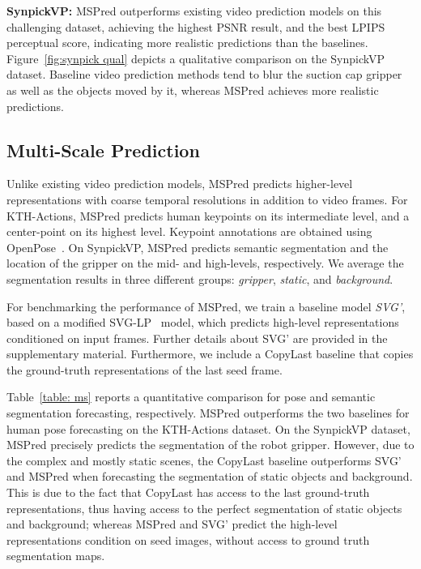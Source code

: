 \documentclass{bmvc2k}
\newcommand{\Figure}[1]{Figure~\ref{#1}}
\newcommand{\Table}[1]{Table~\ref{#1}}
\begin{document}
\textbf{SynpickVP:} MSPred outperforms existing video prediction models on this challenging dataset, achieving the highest PSNR result, and the best LPIPS perceptual score, indicating more realistic predictions than the baselines.
\Figure{fig:synpick qual} depicts a qualitative comparison on the SynpickVP dataset.
Baseline video prediction methods tend to blur the suction cap gripper as well as the objects moved by it, whereas MSPred achieves more realistic predictions.




\subsection{Multi-Scale Prediction}
\label{section: mspred}

Unlike existing video prediction models, MSPred predicts higher-level representations with  coarse temporal resolutions in addition to video frames.
For KTH-Actions, MSPred predicts human keypoints on its intermediate level, and a center-point on its highest level.
Keypoint annotations are obtained using OpenPose~\cite{Cao_RealTimePoseEstimationAffinityFields_2017}.
On SynpickVP, MSPred predicts semantic segmentation and the location of the gripper on the mid- and high-levels, respectively.
We average the segmentation results in three different groups: \emph{gripper}, \emph{static}, and \emph{background}.

For benchmarking the performance of MSPred, we train a baseline model \emph{SVG'}, based on a modified SVG-LP~\cite{Denton_StochasticVideoGenerationWithALearnedPrior_2018} model, which predicts high-level representations conditioned on input frames. Further details about SVG' are provided in the supplementary material.
Furthermore, we include a CopyLast baseline that copies the ground-truth representations of the last seed frame. 


\Table{table: ms} reports a quantitative comparison for pose and semantic segmentation forecasting, respectively.
MSPred outperforms the two baselines for human pose forecasting on the KTH-Actions dataset.
On the SynpickVP dataset, MSPred precisely predicts the segmentation of the robot gripper.
However, due to the complex and mostly static scenes, the CopyLast baseline outperforms SVG' and MSPred when forecasting the segmentation of static objects and background.
This is due to the fact that CopyLast has access to the last ground-truth representations, thus having access to the perfect segmentation of static objects and background; whereas MSPred and SVG' predict the high-level representations condition on seed images, without access to ground truth segmentation maps.
\end{document}
